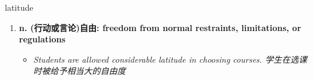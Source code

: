 
\begin{frame}
{\huge latitude}
\begin{center}
\begin{enumerate}\Large
  \item \textbf{n. (行动或言论)自由: freedom from normal restraints, limitations, or regulations}
  \begin{itemize}
    \item \em{\Large{Students are allowed considerable latitude in choosing courses. 学生在选课时被给予相当大的自由度}}
  \end{itemize}
\end{enumerate}
\end{center}
\end{frame}
